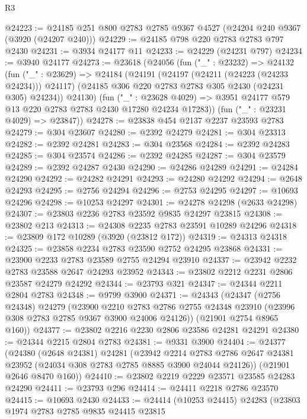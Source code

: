 \begin{lexlean}{R3}
\begin{coremodule}
@24223 := @24185 @251 @800 @2783 @2785 @9367 @4527 (@24204 @240 @9367 (@3920 (@24207 @240)))
@24229 := @24185 @798 @220 @2783 @2783 @797 @2430
@24231 := @3934 @24177 @11
@24233 := @24229 (@24231 @797)
@24234 := @3940 @24177
@24273 := @23618
    (@24056
      (fun ("_" : @23232) =>
      @24132
        (fun ("_" : @23629) =>
        @24184
          (@24191
            (@24197 (@24211 (@24223 (@24233 @24234))) @24117)
            (@24185 @306 @220 @2783 @2783 @305 @2430 (@24231 @305) @24234))
          @24130)
        (fun ("_" : @23628 @4029) =>
        @3951 @24177 @579 @13 @220 @2783 @2783 @2430 @17280 @24234 @17283))
      (fun ("_" : @23231 @4029) => @23847))
@24278 := @23838 @454 @2137 @2237 @23593 @2783
@24279 := @304 @23607
@24280 := @2392 @24279
@24281 := @304 @23313
@24282 := @2392 @24281
@24283 := @304 @23568
@24284 := @2392 @24283
@24285 := @304 @23574
@24286 := @2392 @24285
@24287 := @304 @23579
@24289 := @2392 @24287 @2430
@24290 := @24286 @24289
@24291 := @24284 @24290
@24292 := @24282 @24291
@24293 := @24280 @24292
@24294 := @2648 @24293
@24295 := @2756 @24294
@24296 := @2753 @24295
@24297 := @10693 @24296
@24298 := @10253 @24297
@24301 := @24278 @24298 (@2633 @24298)
@24307 := @23803 @2236 @2783 @23592 @9835 @24297 @23815
@24308 := @23802 @213
@24313 := @24308 @2235 @2783 @23591 @10289 @24296
@24318 := @23809 @172 @10289 (@3920 (@23812 @172))
@24319 := @24313 @24318
@24325 := @23858 @2234 @2783 @23590 @2752 @24295 @23868
@24331 := @23900 @2233 @2783 @23589 @2755 @24294 @23910
@24337 := @23942 @2232 @2783 @23588 @2647 @24293 @23952
@24343 := @23802 @2212 @2231 @2806 @23587 @24279 @24292
@24344 := @23793 @321
@24347 := @24344 @2211 @2804 @2783
@24348 := @9799 @3900
@24371 := @24343
    (@24347
      (@2756 @24348)
      @24279
      (@23900
        @2210
        @2783
        @2786
        @2755
        @24348
        @23910
        (@23996 @308 @2783 @2785 @9367 @3900 @24006 @24126))
      (@21901 @2754 @8965 @160))
@24377 := @23802 @2216 @2230 @2806 @23586 @24281 @24291
@24380 := @24344 @2215 @2804 @2783
@24381 := @9331 @3900
@24404 := @24377
    (@24380
      (@2648 @24381)
      @24281
      (@23942
        @2214
        @2783
        @2786
        @2647
        @24381
        @23952
        (@24034 @308 @2783 @2785 @8885 @3900 @24044 @24126))
      (@21901 @2646 @8470 @160))
@24410 := @23802 @2219 @2229 @23571 @23585 @24283 @24290
@24411 := @23793 @296
@24414 := @24411 @2218 @2786 @23570
@24415 := @10693 @2430
@24433 := @24414
    (@10253 @24415)
    @24283
    (@23803
      @1974
      @2783
      @2785
      @9835
      @24415
      @23815

\end{coremodule}
\end{lexlean}
